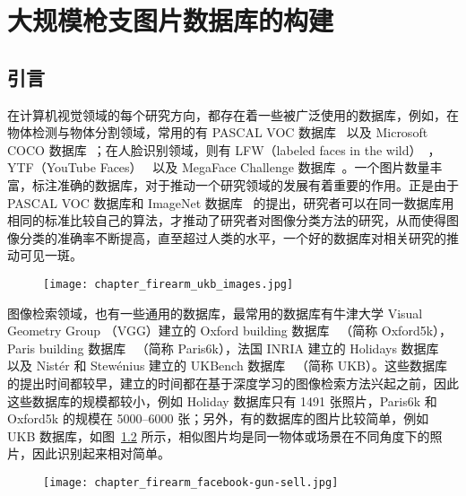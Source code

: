 
\chapter{大规模枪支图片数据库的构建}\label{chapter:firearm_dataset}
\section{引言}
在计算机视觉领域的每个研究方向，都存在着一些被广泛使用的数据库，例如，在物体检测与物体分割领域，常用的有 PASCAL VOC 数据库~\cite{Everingham2014ThePV} 以及 Microsoft COCO 数据库~\cite{Lin2014MicrosoftCC}；在人脸识别领域，则有 LFW（labeled faces in the wild）~\cite{LFWTech}，YTF（YouTube Faces）~\cite{Wolf2011FaceRI} 以及 MegaFace Challenge 数据库~\cite{kemelmacher2016megaface}。一个图片数量丰富，标注准确的数据库，对于推动一个研究领域的发展有着重要的作用。正是由于 PASCAL VOC 数据库和 ImageNet 数据库~\cite{Russakovsky2015ImageNetLS} 的提出，研究者可以在同一数据库用相同的标准比较自己的算法，才推动了研究者对图像分类方法的研究，从而使得图像分类的准确率不断提高，直至超过人类的水平，一个好的数据库对相关研究的推动可见一斑。

\begin{figure}[h]
	\centering
	\texttt{[image: chapter\_firearm\_ukb\_images.jpg]}
	\label{fig:gun_sell_group}
\end{figure}

图像检索领域，也有一些通用的数据库，最常用的数据库有牛津大学 Visual Geometry Group （VGG）建立的 Oxford building 数据库~\cite{Philbin2007ObjectRW} （简称 Oxford5k），Paris building 数据库~\cite{Philbin2008LostIQ} （简称 Paris6k），法国 INRIA 建立的 Holidays 数据库~\cite{Jgou2008HammingEA} 以及 Nist{\'e}r 和 Stew{\'e}nius 建立的 UKBench 数据库~\cite{Nistr2006ScalableRW} （简称 UKB）。这些数据库的提出时间都较早，建立的时间都在基于深度学习的图像检索方法兴起之前，因此这些数据库的规模都较小，例如 Holiday 数据库只有 1491 张照片，Paris6k 和 Oxford5k 的规模在 5000--6000 张；另外，有的数据库的图片比较简单，例如 UKB 数据库，如图~\ref{fig:ukb_images} 所示，相似图片均是同一物体或场景在不同角度下的照片，因此识别起来相对简单。

\begin{figure}[!t]
	\centering
	\texttt{[image: chapter\_firearm\_facebook-gun-sell.jpg]}
	\label{fig:ukb_images}
\end{figure}

